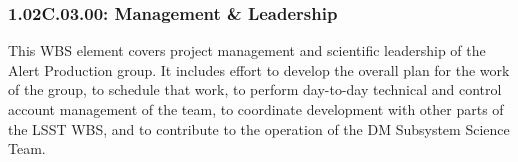 \subsubsection*{1.02C.03.00: Management \& Leadership}

This WBS element covers project management and scientific leadership of the
Alert Production group. It includes effort to develop the overall plan
for the work of the group, to schedule that work, to perform day-to-day
technical and control account management of the team, to coordinate
development with other parts of the LSST WBS, and to contribute to the
operation of the DM Subsystem Science Team.
